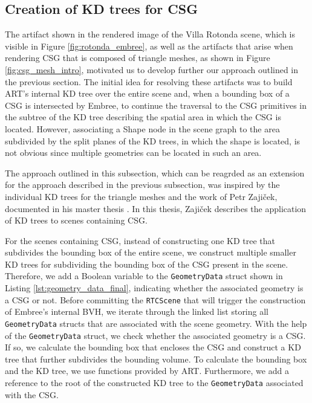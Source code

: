 \subsection{Creation of KD trees for CSG}
\label{subsec:apprach3}

The artifact shown in the rendered image of the Villa Rotonda scene, which is visible in Figure \ref{fig:rotonda_embree}, as well as the artifacts that arise when rendering CSG that is composed of triangle meshes, as shown in Figure \ref{fig:csg_mesh_intro}, motivated us to develop further our approach outlined in the previous section. The initial idea for resolving these artifacts was to build ART's internal KD tree over the entire scene and, when a bounding box of a CSG is intersected by Embree, to continue the traversal to the CSG primitives in the subtree of the KD tree describing the spatial area in which the CSG is located.
However, associating a Shape node in the scene graph to the area subdivided by the split planes of the KD trees, in which the shape is located, is not obvious since multiple geometries can be located in such an area.

The approach outlined in this subsection, which can be reagrded as an extension for the approach described in the previous subsection, was inspired by the individual KD trees for the triangle meshes and the work of Petr Zaji\v{c}ek, documented in his master thesis \cite{zajicek2012}. In this thesis, Zaji\v{c}ek describes the application of KD trees to scenes containing CSG.

For the scenes containing CSG, instead of constructing one KD tree that subdivides the bounding box of the entire scene, we construct multiple smaller KD trees for subdividing the bounding box of the CSG present in the scene.
Therefore, we add a Boolean variable to the \texttt{GeometryData} struct shown in Listing \ref{lst:geometry_data_final}, indicating whether the associated geometry is a CSG or not. Before committing the \texttt{RTCScene} that will trigger the construction of Embree's internal BVH, we iterate through the linked list storing all \texttt{GeometryData} structs that are associated with the scene geometry. With the help of the \texttt{GeometryData} struct, we check whether the associated geometry is a CSG. If so, we calculate the bounding box that encloses the CSG and construct a KD tree that further subdivides the bounding volume. To calculate the bounding box and the KD tree, we use functions provided by ART. Furthermore, we add a reference to the root of the constructed KD tree to the \texttt{GeometryData} associated with the CSG.

